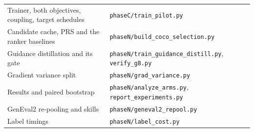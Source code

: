 \documentclass[11pt]{article}
\begin{document}
\begin{table}[h]
\centering
\small
\begin{tabular}{@{}ll@{}}
\toprule
Trainer, both objectives, coupling, target schedules & \texttt{phaseC/train\_pilot.py} \\
Candidate cache, PRS and the ranker baselines & \texttt{phaseN/build\_coco\_selection.py} \\
Guidance distillation and its gate & \texttt{phaseN/train\_guidance\_distill.py}, \texttt{verify\_g8.py} \\
Gradient variance split & \texttt{phaseN/grad\_variance.py} \\
Results and paired bootstrap & \texttt{phaseN/analyze\_arms.py}, \texttt{report\_experiments.py} \\
GenEval2 re-pooling and skills & \texttt{phaseN/geneval2\_repool.py} \\
Label timings & \texttt{phaseN/label\_cost.py} \\
\bottomrule
\end{tabular}
\end{table}
\end{document}

